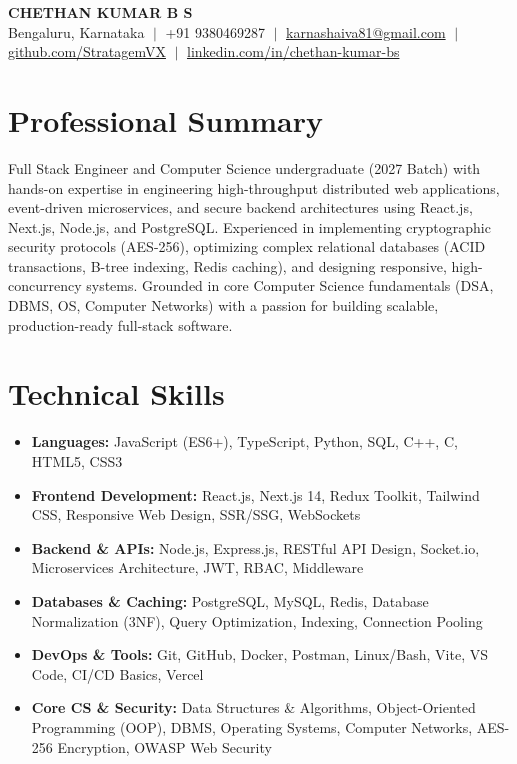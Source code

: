 \documentclass[a4paper,9pt]{article}
\begin{document}
\begin{center}
{\LARGE\textbf{CHETHAN KUMAR B S}}\\[0.22em]
\small 
Bengaluru, Karnataka 
$\;\vert\;$ 
+91 9380469287 
$\;\vert\;$ 
\href{mailto:karnashaiva81@gmail.com}{karnashaiva81@gmail.com} 
$\;\vert\;$ 
\href{https://github.com/StratagemVX}{github.com/StratagemVX} 
$\;\vert\;$ 
\href{https://linkedin.com/in/chethan-kumar-bs}{linkedin.com/in/chethan-kumar-bs}
\end{center}

\section*{Professional Summary}
Full Stack Engineer and Computer Science undergraduate (2027 Batch) with hands-on expertise in engineering high-throughput distributed web applications, event-driven microservices, and secure backend architectures using React.js, Next.js, Node.js, and PostgreSQL. Experienced in implementing cryptographic security protocols (AES-256), optimizing complex relational databases (ACID transactions, B-tree indexing, Redis caching), and designing responsive, high-concurrency systems. Grounded in core Computer Science fundamentals (DSA, DBMS, OS, Computer Networks) with a passion for building scalable, production-ready full-stack software.

\section*{Technical Skills}
\begin{itemize}
\item \textbf{Languages:} JavaScript (ES6+), TypeScript, Python, SQL, C++, C, HTML5, CSS3
\item \textbf{Frontend Development:} React.js, Next.js 14, Redux Toolkit, Tailwind CSS, Responsive Web Design, SSR/SSG, WebSockets
\item \textbf{Backend \& APIs:} Node.js, Express.js, RESTful API Design, Socket.io, Microservices Architecture, JWT, RBAC, Middleware
\item \textbf{Databases \& Caching:} PostgreSQL, MySQL, Redis, Database Normalization (3NF), Query Optimization, Indexing, Connection Pooling
\item \textbf{DevOps \& Tools:} Git, GitHub, Docker, Postman, Linux/Bash, Vite, VS Code, CI/CD Basics, Vercel
\item \textbf{Core CS \& Security:} Data Structures \& Algorithms, Object-Oriented Programming (OOP), DBMS, Operating Systems, Computer Networks, AES-256 Encryption, OWASP Web Security
\end{itemize}
\end{document}
